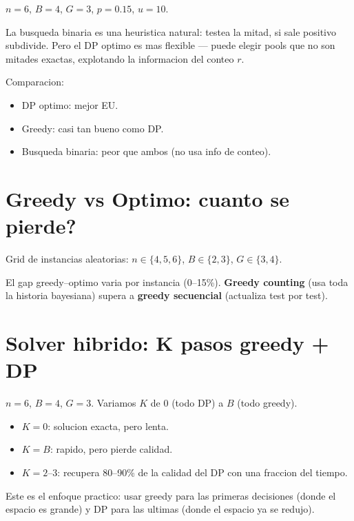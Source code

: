 \documentclass[11pt]{article}
\begin{document}
$n=6$, $B=4$, $G=3$, $p=0.15$, $u=10$.

La busqueda binaria es una heuristica natural: testea la mitad, si sale positivo
subdivide. Pero el DP optimo es mas flexible --- puede elegir pools
que no son mitades exactas, explotando la informacion del conteo $r$.

Comparacion:
\begin{itemize}
  \item DP optimo: mejor EU.
  \item Greedy: casi tan bueno como DP.
  \item Busqueda binaria: peor que ambos (no usa info de conteo).
\end{itemize}

\section{Greedy vs Optimo: cuanto se pierde?}

Grid de instancias aleatorias: $n \in \{4,5,6\}$, $B \in \{2,3\}$, $G \in \{3,4\}$.

El gap greedy--optimo varia por instancia (0--15\%).
\textbf{Greedy counting} (usa toda la historia bayesiana) supera a
\textbf{greedy secuencial} (actualiza test por test).

\section{Solver hibrido: K pasos greedy + DP}

$n=6$, $B=4$, $G=3$. Variamos $K$ de 0 (todo DP) a $B$ (todo greedy).

\begin{itemize}
  \item $K=0$: solucion exacta, pero lenta.
  \item $K=B$: rapido, pero pierde calidad.
  \item $K=2$--$3$: recupera 80--90\% de la calidad del DP con una fraccion del tiempo.
\end{itemize}

Este es el enfoque practico: usar greedy para las primeras decisiones
(donde el espacio es grande) y DP para las ultimas (donde el espacio
ya se redujo).
\end{document}
